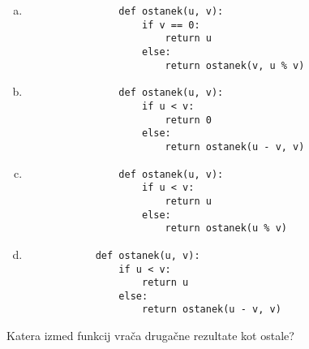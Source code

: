 \documentclass[arhiv, 10pt]{../izpit}
\begin{document}
        \begin{multicols}{2}
        \begin{enumerate}[(a)]
\item 
                \begin{verbatim}
                def ostanek(u, v):
                    if v == 0:
                        return u
                    else:
                        return ostanek(v, u % v)
                \end{verbatim}
            
\item 
                \begin{verbatim}
                def ostanek(u, v):
                    if u < v:
                        return 0
                    else:
                        return ostanek(u - v, v)
                \end{verbatim}
            
\item 
                \begin{verbatim}
                def ostanek(u, v):
                    if u < v:
                        return u
                    else:
                        return ostanek(u % v)
                \end{verbatim}
            
\item 
            \begin{verbatim}
            def ostanek(u, v):
                if u < v:
                    return u
                else:
                    return ostanek(u - v, v)
            \end{verbatim}
        
\end{enumerate}

        \end{multicols}
    
        \naloga*
        
        Katera izmed funkcij vrača drugačne rezultate kot ostale?
    
\end{document}
